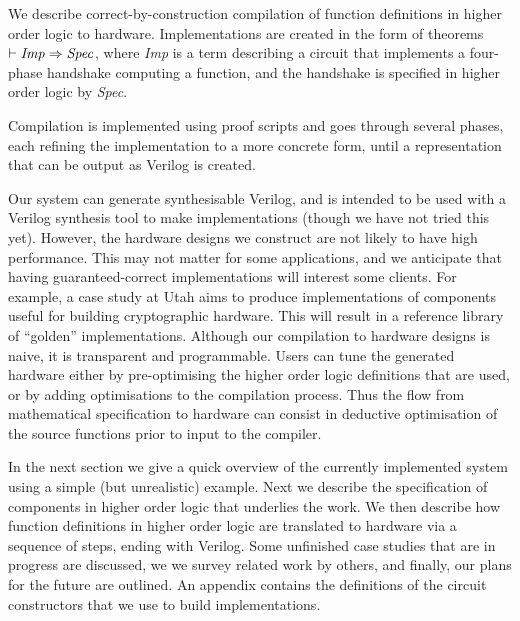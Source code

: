 
We describe correct-by-construction compilation of
function definitions in higher order logic to hardware.  
Implementations are created in the form of theorems $\vdash
{\it{Imp}}\Rightarrow{\it{Spec}}$, where {\it{Imp}} is a term
describing a circuit that implements a four-phase handshake computing
a function, and the handshake is specified in higher order logic by
{\it{Spec}}.

Compilation is implemented using proof
scripts and goes through several phases, each refining the
implementation to a more concrete form, until a representation that
can be output as Verilog is created.


Our system can generate synthesisable Verilog, and is intended to be
used with a Verilog synthesis tool to make implementations (though we
have not tried this yet). However, the hardware designs we construct
are not likely to have high performance. This may not matter for some
applications, and we anticipate that having guaranteed-correct
implementations will interest some clients. For example, a case study
at Utah aims to produce implementations of components useful for
building cryptographic hardware.  This will result in a reference
library of ``golden'' implementations. Although our compilation to
hardware designs is naive, it is transparent and programmable. Users
can tune the generated hardware either by pre-optimising the higher
order logic definitions that are used, or by adding optimisations to
the compilation process. Thus the flow from mathematical
specification to hardware can consist in deductive optimisation of the
source functions prior to input to the compiler.


In the next section we give a quick overview of the currently
implemented system using a simple (but unrealistic) example. Next we
describe the specification of components in higher order logic that
underlies the work. We then describe how function definitions in
higher order logic are translated to hardware via a sequence of steps,
ending with Verilog.  Some unfinished case studies that are in
progress are discussed, we we survey related work by others, and
finally, our plans for the future are outlined. An appendix contains
the definitions of the circuit constructors that we use to build
implementations.
